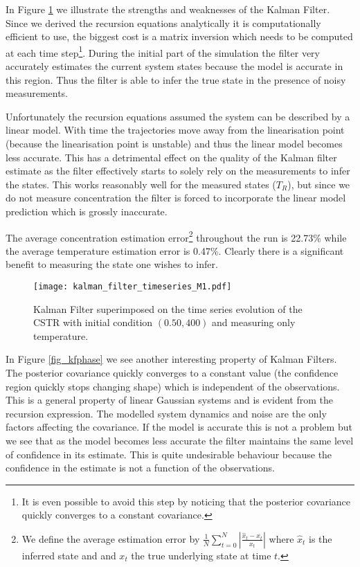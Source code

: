 In Figure \ref{fig_kftimeseries} we illustrate the strengths and weaknesses of the Kalman Filter. Since we derived the recursion equations analytically it is computationally efficient to use, the biggest cost is a matrix inversion which needs to be computed at each time step\footnote{It is even possible to avoid this step by noticing that the posterior covariance quickly converges to a constant covariance.}. During the initial part of the simulation the filter very accurately estimates the current system states because the model is accurate in this region. Thus the filter is able to infer the true state in the presence of noisy measurements. 

Unfortunately the recursion equations assumed the system can be described by a linear model. With time the trajectories move away from the linearisation point (because the linearisation point is unstable) and thus the linear model becomes less accurate. This has a detrimental effect on the quality of the Kalman filter estimate as the filter effectively starts to solely rely on the measurements to infer the states. This works reasonably well for the measured states ($T_R$), but since we do not measure concentration the filter is forced to incorporate the linear model prediction which is grossly inaccurate. 

The average concentration estimation error\footnote{We define the average estimation error by $\frac{1}{N}\sum^N_{t=0}|\frac{\hat{x}_t-x_t}{x_t}|$ where $\hat{x}_t$ is the inferred state and and $x_t$ the true underlying state at time $t$.} throughout the run is 22.73\% while the average temperature estimation error is 0.47\%. Clearly there is a significant benefit to measuring the state one wishes to infer. 
\begin{figure}[H] 
\centering
\texttt{[image: kalman\_filter\_timeseries\_M1.pdf]}
\caption{Kalman Filter superimposed on the time series evolution of the CSTR with initial condition $(0.50, 400)$ and measuring only temperature.}
\label{fig_kftimeseries}
\end{figure}
In Figure \ref{fig_kfphase} we see another interesting property of Kalman Filters. The posterior covariance quickly converges to a constant value (the confidence region quickly stops changing shape) which is independent of the observations. This is a general property of linear Gaussian systems \cite{barber} and is evident from the recursion expression. The modelled system dynamics and noise are the only factors affecting the covariance. If the model is accurate this is not a problem but we see that as the model becomes less accurate the filter maintains the same level of confidence in its estimate. This is quite undesirable behaviour because the confidence in the estimate is not a function of the observations. 

